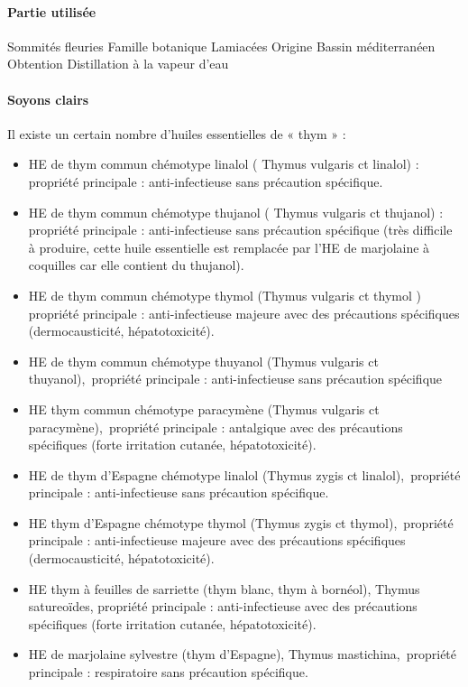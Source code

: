 \documentclass[12pt,a4wide]{article}
\begin{document}
\paragraph{Partie utilisée}
\label{sec-4-11-2-2}
Sommités fleuries
Famille botanique
Lamiacées
Origine
Bassin méditerranéen
Obtention
Distillation à la vapeur d'eau

\paragraph{Soyons clairs}
\label{sec-4-11-2-3}

Il existe un certain nombre d'huiles essentielles de « thym » :
\begin{itemize}
\item HE de thym commun chémotype linalol ( Thymus vulgaris ct linalol) : propriété principale : anti-infectieuse sans précaution spécifique.
\item HE de thym commun chémotype thujanol ( Thymus vulgaris ct thujanol) : propriété principale : anti-infectieuse sans précaution spécifique (très difficile à produire, cette huile essentielle est remplacée par l'HE de marjolaine à coquilles car elle contient du thujanol).
\item HE de thym commun chémotype thymol (Thymus vulgaris ct thymol ) propriété principale : anti-infectieuse majeure avec des précautions spécifiques (dermocausticité, hépatotoxicité).
\item HE de thym commun chémotype thuyanol (Thymus vulgaris ct thuyanol), propriété principale : anti-infectieuse sans précaution spécifique
\item HE thym commun chémotype paracymène (Thymus vulgaris ct paracymène), propriété principale : antalgique avec des précautions spécifiques (forte irritation cutanée, hépatotoxicité).
\item HE de thym d'Espagne chémotype linalol (Thymus zygis ct linalol), propriété principale : anti-infectieuse sans précaution spécifique.
\item HE thym d'Espagne chémotype thymol (Thymus zygis ct thymol), propriété principale : anti-infectieuse majeure avec des précautions spécifiques (dermocausticité, hépatotoxicité).
\item HE thym à feuilles de sarriette (thym blanc, thym à bornéol), Thymus satureoïdes, propriété principale : anti-infectieuse avec des précautions spécifiques (forte irritation cutanée, hépatotoxicité).
\item HE de marjolaine sylvestre (thym d'Espagne), Thymus mastichina, propriété principale : respiratoire sans précaution spécifique.
\end{itemize}
\end{document}
